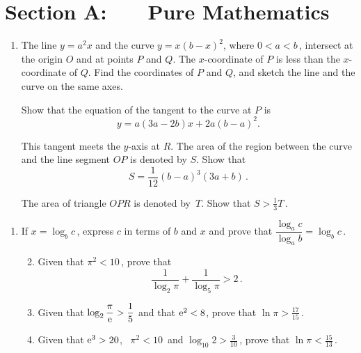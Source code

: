 \documentclass[a4, 11pt]{report}
\newlength{\qspace}
\newcounter{qnumber}
\newenvironment{question}%
 {\vspace{\qspace}
  \begin{enumerate}[\bfseries 1\quad][10]%
    \setcounter{enumi}{\value{qnumber}}%
    \item%
 }
{
  \end{enumerate}
  \filbreak
  \stepcounter{qnumber}
 }
\newenvironment{questionparts}[1][1]%
 {
  \begin{enumerate}[\bfseries (i)]%
    \setcounter{enumii}{#1}
    \addtocounter{enumii}{-1}
    \setlength{\itemsep}{5mm}
    \setlength{\parskip}{8pt}
 }
 {
  \end{enumerate}
 }
\def\e{{\rm e}}
\newcommand{\ds}{\displaystyle}
\begin{document}
\setcounter{page}{2}

\section*{Section A: \ \ \ Pure Mathematics}

\begin{question}


The line $y=a^2 x$ 
and  the curve 
 $y=x(b-x)^2$, where $0<a<b\,$, 
intersect at the origin 
$O$ and at points $P$ and $Q $. The $x$-coordinate of 
$P$ is less than the $x$-coordinate  of $Q$. 
Find the coordinates of $P$  and $Q$, 
and sketch the line and the
curve   on the same axes. 

Show that the equation
of the tangent to the curve at $P$ is
\[
y = a(3a-2b)x + 2a(b-a)^2
.
\]

This tangent meets the $y$-axis at $R$. 
The area of the region between the curve and the line 
segment $OP$ is denoted by $S$.
Show that 
\[
S= \frac1{12}(b-a)^3(3a+b)\,.
\] 

The area of triangle 
$OPR$ is denoted by~$T$. 
Show  that $S>\frac{1}{3}T\,$.


\end{question}


\begin{question}
If $x=\log_bc\,$, express $c$ in terms of $b$ and $x$
and prove that
$
\dfrac{\log_a c}{\log_a b}
=
\ds \log_b c 
\,$.

\begin{questionparts}
\item Given that $\pi^2 < 10\,$, prove that
\[
\frac{1}{\log_2 \pi}+\frac{1}{\log_5 \pi} > 2\,.
\]
\item Given that $\ds \log_2  \frac{\pi}{\e}  > \frac{1}{5}$ 
and that $\e^2 < 8$, prove that $\ln \pi > \frac{17}{15}\,$.

\item Given that $\e^3 >20$, \,
$\pi^2 < 10\,$ 
 and  $\log_{10}2 >\frac{3}{10}\,$, 
prove that $\ln \pi < \frac{15}{13}\,$.
\end{questionparts}

\end{question}
\end{document}
